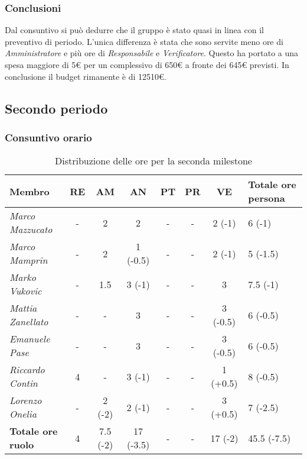 \subsubsection{Conclusioni}
Dal consuntivo si può dedurre che il gruppo è stato quasi in linea con il preventivo di periodo.
L'unica differenza è stata che sono servite meno ore di \textit{Amministratore} e più
ore di \textit{Responsabile} e \textit{Verificatore}. Questo ha portato a una spesa maggiore di 5€ per un
complessivo di 650€ a fronte dei 645€ previsti.
In conclusione il budget rimanente è di \num{12510}€.



\subsection{Secondo periodo}

\subsubsection{Consuntivo orario}
\begin{table}[H]
    \centering
    \begin{tabular}{|L{2cm}|c|c|c|c|c|c|C{3cm}|}
    \hline
    \textbf{Membro} & \textbf{RE} & \textbf{AM} & \textbf{AN} & \textbf{PT} & \textbf{PR} & \textbf{VE} & \textbf{Totale ore persona} \\ \hline
    \textit{Marco Mazzucato}  & -      & 2            & 2          & - & - & 2 (-1)        & 6 (-1)         \\ \hline
    \textit{Marco Mamprin}    & -      & 2            & 1 (-0.5)   & - & - & 2 (-1)        & 5 (-1.5)       \\ \hline
    \textit{Marko Vukovic}    & -      & 1.5          & 3 (-1)     & - & - & 3             & 7.5 (-1)       \\ \hline
    \textit{Mattia Zanellato} & -      & -            & 3          & - & - & 3 (-0.5)      & 6 (-0.5)       \\ \hline
    \textit{Emanuele Pase}    & -      & -            & 3          & - & - & 3 (-0.5)      & 6 (-0.5)       \\ \hline
    \textit{Riccardo Contin}  & 4      & -            & 3 (-1)     & - & - & 1 (+0.5)      & 8 (-0.5)       \\ \hline
    \textit{Lorenzo Onelia}   & -      & 2 (-2)       & 2 (-1)     & - & - & 3 (+0.5)      & 7 (-2.5)       \\ \hline
    \textbf{Totale ore ruolo} & 4      & 7.5 (-2)     & 17 (-3.5)  & - & - & 17 (-2)       & 45.5 (-7.5)    \\ \hline
    \end{tabular}
    \caption{Distribuzione delle ore per la seconda milestone}
\end{table}

